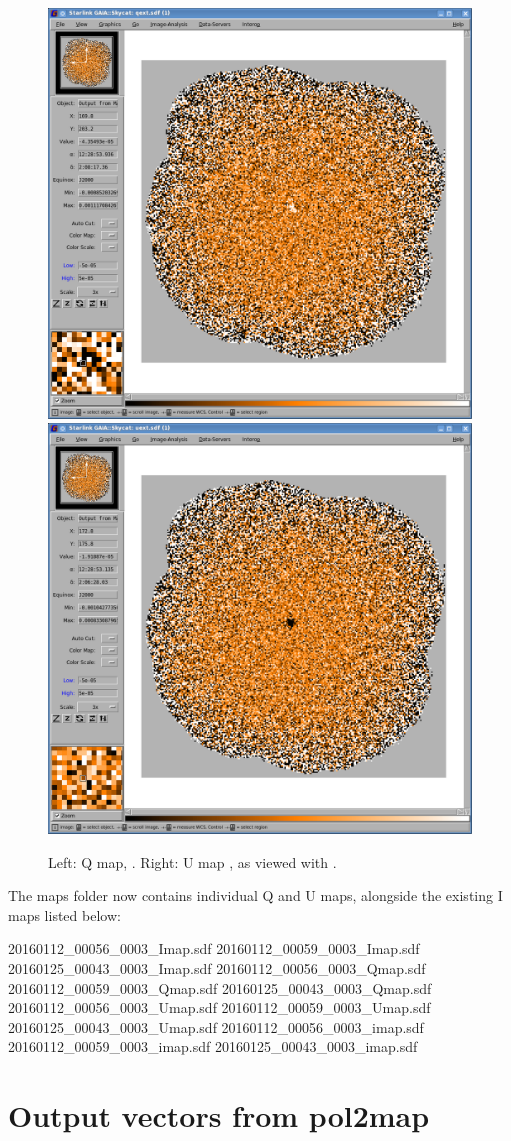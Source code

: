\begin{figure}[t!]
\begin{center}
\includegraphics[width=0.46\linewidth]{sc22-gaia-view-qext.png}
\includegraphics[width=0.46\linewidth]{sc22-gaia-view-uext.png}
\label{fig:gaia-qext-uext}
\caption [Q and U maps in GAIA]{
  \small Left: Q map, . Right: U map , as viewed with \GAIA.
}
\end{center}
\end{figure}



The maps folder now contains individual Q and U maps, alongside the
existing I maps listed below:

\begin{terminalv}
20160112_00056_0003_Imap.sdf  20160112_00059_0003_Imap.sdf  20160125_00043_0003_Imap.sdf
20160112_00056_0003_Qmap.sdf  20160112_00059_0003_Qmap.sdf  20160125_00043_0003_Qmap.sdf
20160112_00056_0003_Umap.sdf  20160112_00059_0003_Umap.sdf  20160125_00043_0003_Umap.sdf
20160112_00056_0003_imap.sdf  20160112_00059_0003_imap.sdf  20160125_00043_0003_imap.sdf
\end{terminalv}




\section{Output vectors from pol2map}



